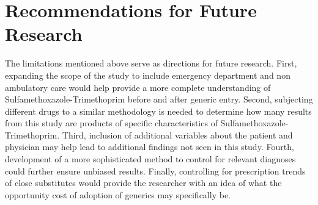 \section{Recommendations for Future Research}
The limitations mentioned above serve as directions for future research. First, expanding the scope of the study to include emergency department and non ambulatory care would help provide a more complete understanding of Sulfamethoxazole-Trimethoprim before and after generic entry. Second, subjecting different drugs to a similar methodology is needed to determine how many results from this study are products of specific characteristics of Sulfamethoxazole-Trimethoprim. Third, inclusion of additional variables about the patient and physician may help lead to additional findings not seen in this study. Fourth, development of a more sophisticated method to control for relevant diagnoses could further ensure unbiased results. Finally, controlling for prescription trends of close substitutes would provide the researcher with an idea of what the opportunity cost of adoption of generics may specifically be. 
